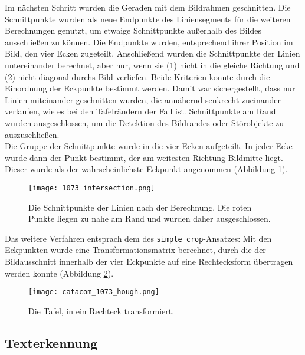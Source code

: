 Im nächsten Schritt wurden die Geraden mit dem Bildrahmen geschnitten. Die Schnittpunkte wurden als neue Endpunkte des Liniensegments für die weiteren Berechnungen genutzt, um etwaige Schnittpunkte außerhalb des Bildes ausschließen zu können. Die Endpunkte wurden, entsprechend ihrer Position im Bild, den vier Ecken zugeteilt. Anschließend wurden die Schnittpunkte der Linien untereinander berechnet, aber nur, wenn sie (1) nicht in die gleiche Richtung und (2) nicht diagonal durchs Bild verliefen. Beide Kriterien konnte durch die Einordnung der Eckpunkte bestimmt werden. Damit war sichergestellt, dass nur Linien miteinander geschnitten wurden, die annähernd senkrecht zueinander verlaufen, wie es bei den Tafelrändern der Fall ist. Schnittpunkte am Rand wurden ausgeschlossen, um die Detektion des Bildrandes oder Störobjekte zu auszuschließen.\\
Die Gruppe der Schnittpunkte wurde in die vier Ecken aufgeteilt. In jeder Ecke wurde dann der Punkt bestimmt, der am weitesten Richtung Bildmitte liegt. Dieser wurde als der wahrscheinlichste Eckpunkt angenommen (Abbildung \ref{fig:intersection}).
\begin{figure}[h!]
\centering
\texttt{[image: 1073\_intersection.png]}
\caption{Die Schnittpunkte der Linien nach der Berechnung. Die roten Punkte liegen zu nahe am Rand und wurden daher ausgeschlossen.}
\label{fig:intersection}
\end{figure}
Das weitere Verfahren entsprach dem des \verb|simple crop|-Ansatzes: Mit den Eckpunkten wurde eine Transformationsmatrix berechnet, durch die der Bildausschnitt innerhalb der vier Eckpunkte auf eine Rechtecksform übertragen werden konnte (Abbildung \ref{fig:houghcrop}).
\begin{figure}[h!]
\centering
\texttt{[image: catacom\_1073\_hough.png]}
\caption{Die Tafel, in ein Rechteck transformiert.}
\label{fig:houghcrop}
\end{figure}

\subsection{Texterkennung}

